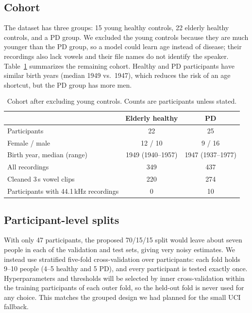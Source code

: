 \documentclass{article}
\begin{document}
\subsection{Cohort}
The dataset has three groups: 15 young healthy controls, 22 elderly healthy controls, and a PD group. We excluded the young controls because they are much younger than the PD group, so a model could learn age instead of disease; their recordings also lack vowels and their file names do not identify the speaker. Table~\ref{tab:cohort} summarizes the remaining cohort. Healthy and PD participants have similar birth years (median 1949 vs.\ 1947), which reduces the risk of an age shortcut, but the PD group has more men.

\begin{table}[t]
\caption{Cohort after excluding young controls. Counts are participants unless stated.}
\label{tab:cohort}
\centering
\small
\begin{tabular}{lcc}
\toprule
 & Elderly healthy & PD \\
\midrule
Participants & 22 & 25 \\
Female / male & 12 / 10 & 9 / 16 \\
Birth year, median (range) & 1949 (1940--1957) & 1947 (1937--1977) \\
All recordings & 349 & 437 \\
Cleaned 3\,s vowel clips & 220 & 274 \\
Participants with 44.1\,kHz recordings & 0 & 10 \\
\bottomrule
\end{tabular}
\end{table}

\subsection{Participant-level splits}
With only 47 participants, the proposed 70/15/15 split would leave about seven people in each of the validation and test sets, giving very noisy estimates. We instead use stratified five-fold cross-validation over participants: each fold holds 9--10 people (4--5 healthy and 5 PD), and every participant is tested exactly once. Hyperparameters and thresholds will be selected by inner cross-validation within the training participants of each outer fold, so the held-out fold is never used for any choice. This matches the grouped design we had planned for the small UCI fallback.
\end{document}
